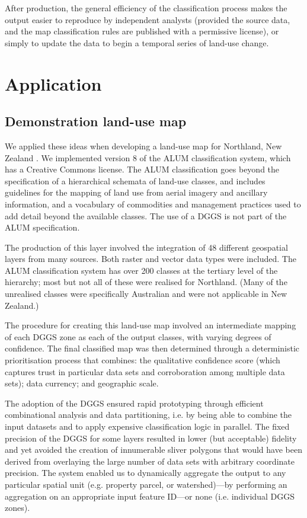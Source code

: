 \documentclass[]{interact}
\theoremstyle{plain}%
\theoremstyle{definition}
\theoremstyle{remark}
\begin{document}
After production, the general efficiency of the classification process makes the output easier to reproduce by independent analysts (provided the source data, and the map classification rules are published with a permissive license), or simply to update the data to begin a temporal series of land-use change.

\section{Application} %

\subsection{Demonstration land-use map}

We applied these ideas when developing a land-use map for Northland, New Zealand \citep[see][]{law2023}. We implemented version 8 of the \ac{ALUM} classification system, which has a Creative Commons license. The \ac{ALUM} classification goes beyond the specification of a hierarchical schemata of land-use classes, and includes guidelines for the mapping of land use from aerial imagery and ancillary information, and a vocabulary of commodities and management practices used to add detail beyond the available classes. The use of a \ac{DGGS} is not part of the \ac{ALUM} specification.

The production of this layer involved the integration of 48 different geospatial layers from many sources. Both raster and vector data types were included. The \ac{ALUM} classification system has over 200 classes at the tertiary level of the hierarchy; most but not all of these were realised for Northland. (Many of the unrealised classes were specifically Australian and were not applicable in New Zealand.)

The procedure for creating this land-use map involved an intermediate mapping of each \ac{DGGS} zone as each of the output classes, with varying degrees of confidence. The final classified map was then determined through a deterministic prioritisation process that combines: the qualitative confidence score (which captures trust in particular data sets and corroboration among multiple data sets); data currency; and geographic scale.

The adoption of the \ac{DGGS} ensured rapid prototyping through efficient combinational analysis and data partitioning, i.e. by being able to combine the input datasets and to apply expensive classification logic in parallel. The fixed precision of the \ac{DGGS} for some layers resulted in lower (but acceptable) fidelity and yet avoided the creation of innumerable sliver polygons that would have been derived from overlaying the large number of data sets with arbitrary coordinate precision. The system enabled us to dynamically aggregate the output to any particular spatial unit (e.g. property parcel, or watershed)---by performing an aggregation on an appropriate input feature ID---or none (i.e. individual \ac{DGGS} zones).
\end{document}
